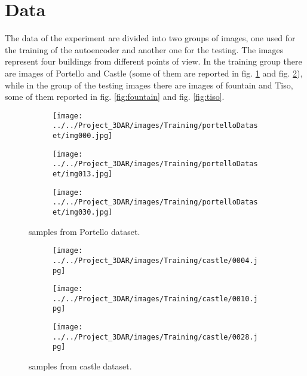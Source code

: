 
\section{Data}
The data of the experiment are divided into two groups of images, one used for the training of the autoencoder and another one for the testing. The images represent four buildings from different points of view. In the training group there are images of Portello and Castle (some of them are reported in fig. \ref{fig:portello} and fig. \ref{fig:castle}), while in the group of the testing images there are images of fountain and Tiso, some of them reported in fig. \ref{fig:fountain} and fig. \ref{fig:tiso}.

\begin{figure}[H]
     \centering
     \begin{subfigure}[b]{0.3\textwidth}
         \centering
         \texttt{[image: ../../Project\_3DAR/images/Training/portelloDataset/img000.jpg]}
     \end{subfigure}
     \hfill
     \begin{subfigure}[b]{0.3\textwidth}
         \centering
         \texttt{[image: ../../Project\_3DAR/images/Training/portelloDataset/img013.jpg]}
     \end{subfigure}
     \hfill
     \begin{subfigure}[b]{0.3\textwidth}
         \centering
         \texttt{[image: ../../Project\_3DAR/images/Training/portelloDataset/img030.jpg]}
     \end{subfigure}
        \caption{samples from Portello dataset.}
        \label{fig:portello}
\end{figure}

\begin{figure}[H]
     \centering
     \begin{subfigure}[b]{0.3\textwidth}
         \centering
         \texttt{[image: ../../Project\_3DAR/images/Training/castle/0004.jpg]}
     \end{subfigure}
     \hfill
     \begin{subfigure}[b]{0.3\textwidth}
         \centering
         \texttt{[image: ../../Project\_3DAR/images/Training/castle/0010.jpg]}
     \end{subfigure}
     \hfill
     \begin{subfigure}[b]{0.3\textwidth}
         \centering
         \texttt{[image: ../../Project\_3DAR/images/Training/castle/0028.jpg]}
     \end{subfigure}
        \caption{samples from castle dataset.}
        \label{fig:castle}
\end{figure}


